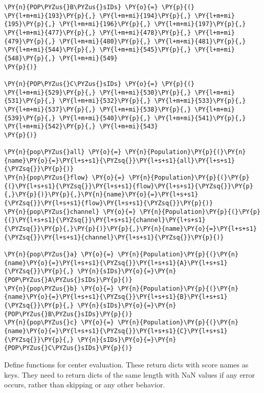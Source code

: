 \begin{tcolorbox}[breakable, size=fbox, boxrule=1pt, pad at break*=1mm,colback=cellbackground, colframe=cellborder]
\begin{Verbatim}[commandchars=\\\{\}]
\PY{n}{POP\PYZus{}B\PYZus{}sIDs} \PY{o}{=} \PY{p}{(}
\PY{l+m+mi}{193}\PY{p}{,} \PY{l+m+mi}{194}\PY{p}{,} \PY{l+m+mi}{195}\PY{p}{,} \PY{l+m+mi}{196}\PY{p}{,} \PY{l+m+mi}{197}\PY{p}{,} \PY{l+m+mi}{477}\PY{p}{,} \PY{l+m+mi}{478}\PY{p}{,} \PY{l+m+mi}{479}\PY{p}{,} \PY{l+m+mi}{480}\PY{p}{,} \PY{l+m+mi}{481}\PY{p}{,} \PY{l+m+mi}{544}\PY{p}{,} \PY{l+m+mi}{545}\PY{p}{,} \PY{l+m+mi}{548}\PY{p}{,} \PY{l+m+mi}{549}
\PY{p}{)}

\PY{n}{POP\PYZus{}C\PYZus{}sIDs} \PY{o}{=} \PY{p}{(}
\PY{l+m+mi}{529}\PY{p}{,} \PY{l+m+mi}{530}\PY{p}{,} \PY{l+m+mi}{531}\PY{p}{,} \PY{l+m+mi}{532}\PY{p}{,} \PY{l+m+mi}{533}\PY{p}{,} \PY{l+m+mi}{537}\PY{p}{,} \PY{l+m+mi}{538}\PY{p}{,} \PY{l+m+mi}{539}\PY{p}{,} \PY{l+m+mi}{540}\PY{p}{,} \PY{l+m+mi}{541}\PY{p}{,} \PY{l+m+mi}{542}\PY{p}{,} \PY{l+m+mi}{543}
\PY{p}{)}

\PY{n}{pop\PYZus{}all} \PY{o}{=} \PY{n}{Population}\PY{p}{(}\PY{n}{name}\PY{o}{=}\PY{l+s+s1}{\PYZsq{}}\PY{l+s+s1}{all}\PY{l+s+s1}{\PYZsq{}}\PY{p}{)}
\PY{n}{pop\PYZus{}flow} \PY{o}{=} \PY{n}{Population}\PY{p}{(}\PY{p}{(}\PY{l+s+s1}{\PYZsq{}}\PY{l+s+s1}{flow}\PY{l+s+s1}{\PYZsq{}}\PY{p}{,}\PY{p}{)}\PY{p}{,}\PY{n}{name}\PY{o}{=}\PY{l+s+s1}{\PYZsq{}}\PY{l+s+s1}{flow}\PY{l+s+s1}{\PYZsq{}}\PY{p}{)}
\PY{n}{pop\PYZus{}channel} \PY{o}{=} \PY{n}{Population}\PY{p}{(}\PY{p}{(}\PY{l+s+s1}{\PYZsq{}}\PY{l+s+s1}{channel}\PY{l+s+s1}{\PYZsq{}}\PY{p}{,}\PY{p}{)}\PY{p}{,}\PY{n}{name}\PY{o}{=}\PY{l+s+s1}{\PYZsq{}}\PY{l+s+s1}{channel}\PY{l+s+s1}{\PYZsq{}}\PY{p}{)}

\PY{n}{pop\PYZus{}a} \PY{o}{=} \PY{n}{Population}\PY{p}{(}\PY{n}{name}\PY{o}{=}\PY{l+s+s1}{\PYZsq{}}\PY{l+s+s1}{A}\PY{l+s+s1}{\PYZsq{}}\PY{p}{,} \PY{n}{sIDs}\PY{o}{=}\PY{n}{POP\PYZus{}A\PYZus{}sIDs}\PY{p}{)}
\PY{n}{pop\PYZus{}b} \PY{o}{=} \PY{n}{Population}\PY{p}{(}\PY{n}{name}\PY{o}{=}\PY{l+s+s1}{\PYZsq{}}\PY{l+s+s1}{B}\PY{l+s+s1}{\PYZsq{}}\PY{p}{,} \PY{n}{sIDs}\PY{o}{=}\PY{n}{POP\PYZus{}B\PYZus{}sIDs}\PY{p}{)}
\PY{n}{pop\PYZus{}c} \PY{o}{=} \PY{n}{Population}\PY{p}{(}\PY{n}{name}\PY{o}{=}\PY{l+s+s1}{\PYZsq{}}\PY{l+s+s1}{C}\PY{l+s+s1}{\PYZsq{}}\PY{p}{,} \PY{n}{sIDs}\PY{o}{=}\PY{n}{POP\PYZus{}C\PYZus{}sIDs}\PY{p}{)}
\end{Verbatim}
\end{tcolorbox}

Define functions for center evaluation. These return dicts with score
names as keys. They need to return dicts of the same length with NaN
values if any error occurs, rather than skipping or any other behavior.

